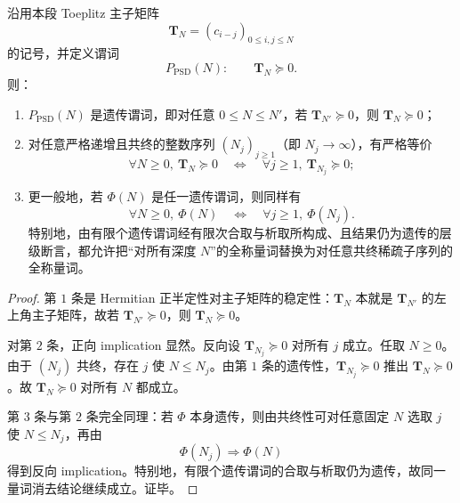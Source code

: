 \begin{theorem}\label{thm:xi-toeplitz-psd-cofinal-sparsification-hereditary}
沿用本段 Toeplitz 主子矩阵
\[
\mathbf T_N=(c_{i-j})_{0\le i,j\le N}
\]
的记号，并定义谓词
\[
P_{\mathrm{PSD}}(N):\qquad \mathbf T_N\succeq 0.
\]
则：
\begin{enumerate}
  \item \(P_{\mathrm{PSD}}(N)\) 是遗传谓词，即对任意 \(0\le N\le N'\)，若 \(\mathbf T_{N'}\succeq 0\)，则 \(\mathbf T_N\succeq 0\)；
  \item 对任意严格递增且共终的整数序列 \((N_j)_{j\ge 1}\)（即 \(N_j\to\infty\)），有严格等价
  \[
  \forall N\ge 0,\ \mathbf T_N\succeq 0
  \quad\Longleftrightarrow\quad
  \forall j\ge 1,\ \mathbf T_{N_j}\succeq 0;
  \]
  \item 更一般地，若 \(\Phi(N)\) 是任一遗传谓词，则同样有
  \[
  \forall N\ge 0,\ \Phi(N)
  \quad\Longleftrightarrow\quad
  \forall j\ge 1,\ \Phi(N_j).
  \]
  特别地，由有限个遗传谓词经有限次合取与析取所构成、且结果仍为遗传的层级断言，都允许把“对所有深度 \(N\)”的全称量词替换为对任意共终稀疏子序列的全称量词。
\end{enumerate}
\end{theorem}

\begin{proof}
第 \(1\) 条是 Hermitian 正半定性对主子矩阵的稳定性：\(\mathbf T_N\) 本就是 \(\mathbf T_{N'}\) 的左上角主子矩阵，故若 \(\mathbf T_{N'}\succeq 0\)，则 \(\mathbf T_N\succeq 0\)。

对第 \(2\) 条，正向 implication 显然。反向设 \(\mathbf T_{N_j}\succeq 0\) 对所有 \(j\) 成立。任取 \(N\ge 0\)。由于 \((N_j)\) 共终，存在 \(j\) 使 \(N\le N_j\)。由第 \(1\) 条的遗传性，\(\mathbf T_{N_j}\succeq 0\) 推出 \(\mathbf T_N\succeq 0\)。故 \(\mathbf T_N\succeq 0\) 对所有 \(N\) 都成立。

第 \(3\) 条与第 \(2\) 条完全同理：若 \(\Phi\) 本身遗传，则由共终性可对任意固定 \(N\) 选取 \(j\) 使 \(N\le N_j\)，再由
\[
\Phi(N_j)\Longrightarrow \Phi(N)
\]
得到反向 implication。特别地，有限个遗传谓词的合取与析取仍为遗传，故同一量词消去结论继续成立。证毕。
\end{proof}
